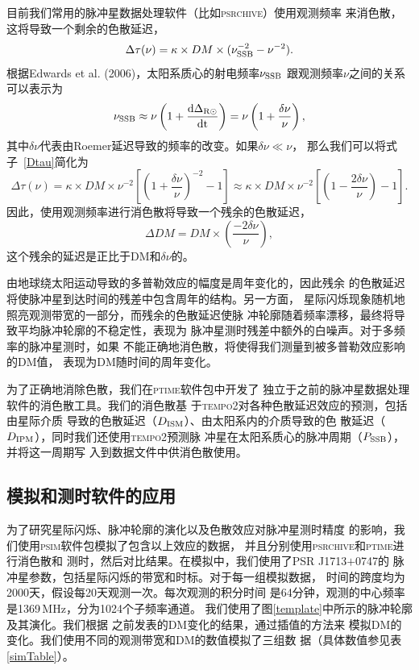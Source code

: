 目前我们常用的脉冲星数据处理软件（比如\textsc{psrchive}）使用观测频率
来消色散，这将导致一个剩余的色散延迟，
\begin{equation}
\Delta\tau(\nu)=\kappa\times DM\times(\nu_{\rm{SSB}}^{-2}-\nu^{-2}).
\label{Dtau}
\end{equation}
根据Edwards et al. (2006)\supercite{Edwards06}，太阳系质心的射电频率$\nu_{\rm{SSB}}$
跟观测频率$\nu$之间的关系可以表示为
\begin{equation}
\nu_{\rm{SSB}}\approx\nu\left(1+\frac{\rm{d}\Delta_{\rm{R\odot}}}{\rm{d}t}\right)=\nu\left(1+\frac{\delta\nu}{\nu}\right),
\end{equation}
%
其中$\delta\nu$代表由Roemer延迟导致的频率的改变。如果$\delta\nu\ll\nu$，
那么我们可以将式子~\ref{Dtau}简化为
%
\begin{equation}
\Delta\tau(\nu)=\kappa\times DM\times\nu^{-2}\left[\left(1+\frac{\delta\nu}{\nu}\right)^{-2}-1\right]\approx\kappa\times DM\times\nu^{-2}\left[\left(1-\frac{2\delta\nu}{\nu}\right)-1\right].
\end{equation}
%
因此，使用观测频率进行消色散将导致一个残余的色散延迟，
\begin{equation}
\Delta DM=DM\times\left(\frac{-2\delta\nu}{\nu}\right),
\label{dDM}
\end{equation}
这个残余的延迟是正比于DM和$\delta\nu$的。

由地球绕太阳运动导致的多普勒效应的幅度是周年变化的，因此残余
的色散延迟将使脉冲星到达时间的残差中包含周年的结构。另一方面，
星际闪烁现象随机地照亮观测带宽的一部分，而残余的色散延迟使脉
冲轮廓随着频率漂移，最终将导致平均脉冲轮廓的不稳定性，表现为
脉冲星测时残差中额外的白噪声。对于多频率的脉冲星测时，如果
不能正确地消色散，将使得我们测量到被多普勒效应影响的DM值，
表现为DM随时间的周年变化。

为了正确地消除色散，我们在\textsc{ptime}软件包中开发了
独立于之前的脉冲星数据处理软件的消色散工具。我们的消色散基
于\textsc{tempo2}对各种色散延迟效应的预测，包括由星际介质
导致的色散延迟（$D_{\rm{ISM}}$）、由太阳系内的介质导致的色
散延迟（$D_{\rm{IPM}}$），同时我们还使用\textsc{tempo2}预测脉
冲星在太阳系质心的脉冲周期（$P_{\rm{SSB}}$），并将这一周期写
入到数据文件中供消色散使用。

\subsection{模拟和测时软件的应用}

为了研究星际闪烁、脉冲轮廓的演化以及色散效应对脉冲星测时精度
的影响，我们使用\textsc{psim}软件包模拟了包含以上效应的数据，
并且分别使用\textsc{psrchive}和\textsc{ptime}进行消色散和
测时，然后对比结果。在模拟中，我们使用了PSR J1713$+$0747的
脉冲星参数，包括星际闪烁的带宽和时标。对于每一组模拟数据，
时间的跨度均为2000天，假设每20天观测一次。每次观测的积分时间
是64分钟，观测的中心频率是1369\,MHz，分为1024个子频率通道。
我们使用了图\ref{template}中所示的脉冲轮廓及其演化。我们根据
之前发表的DM变化的结果\supercite{Keith13}，通过插值的方法来
模拟DM的变化。我们使用不同的观测带宽和DM的数值模拟了三组数
据（具体数值参见表\ref{simTable}）。

